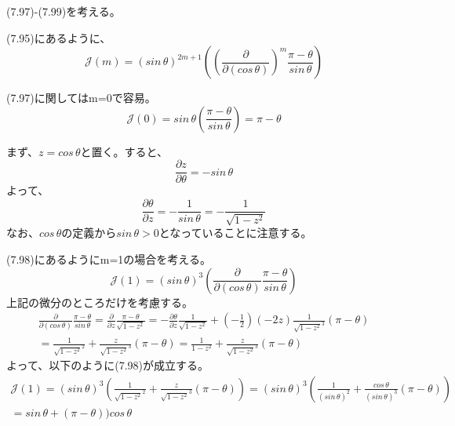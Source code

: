 \documentclass{jsarticle}
\begin{document}
(7.97)-(7.99)を考える。

(7.95)にあるように、
\begin{equation}
\mathcal{J}(m) = (sin\,\theta)^{2m+1} ((\frac{\partial}{\partial(cos\,\theta)})^{m}\frac{\pi - \theta}{sin\,\theta})
\end{equation}

(7.97)に関してはm=0で容易。
\begin{equation}
\mathcal{J}(0) = sin\,\theta (\frac{\pi - \theta}{sin\,\theta}) = \pi - \theta
\end{equation}

まず、$z = cos\,\theta$と置く。すると、
\begin{equation}
\frac{\partial z}{\partial \theta} = -sin\,\theta
\end{equation}
よって、
\begin{equation}
\frac{\partial \theta}{\partial z} = -\frac{1}{sin\,\theta} =  -\frac{1}{\sqrt{1-z^2}}
\end{equation}
なお、$cos\,\theta$の定義から$sin\,\theta > 0$となっていることに注意する。

(7.98)にあるようにm=1の場合を考える。
\begin{equation}
\mathcal{J}(1) = (sin\,\theta)^{3} (\frac{\partial}{\partial(cos\,\theta)}\frac{\pi - \theta}{sin\,\theta})
\end{equation}
上記の微分のところだけを考慮する。
\begin{equation}
\begin{split}
\frac{\partial}{\partial(cos\,\theta)}\frac{\pi - \theta}{sin\,\theta} = \frac{\partial}{\partial z}\frac{\pi - \theta}{\sqrt{1-z^2}}
= -\frac{\partial \theta}{\partial z}\frac{1}{\sqrt{1-z^2}} + (-\frac{1}{2})(-2z)\frac{1}{\sqrt{1-z^2}^3}(\pi - \theta)\\
= \frac{1}{\sqrt{1-z^2}^2} + \frac{z}{\sqrt{1-z^2}^3}(\pi - \theta)
= \frac{1}{1-z^2} + \frac{z}{\sqrt{1-z^2}^3}(\pi - \theta)
\end{split}
\end{equation}
よって、以下のように(7.98)が成立する。
\begin{equation}
\begin{split}
\mathcal{J}(1) = (sin\,\theta)^{3} (\frac{1}{\sqrt{1-z^2}^2} + \frac{z}{\sqrt{1-z^2}^3}(\pi - \theta))
=(sin\,\theta)^{3} (\frac{1}{(sin\,\theta)^2} + \frac{cos\,\theta}{(sin\,\theta)^3}(\pi - \theta))\\
=sin\,\theta + (\pi - \theta))cos\,\theta
\end{split}
\end{equation}
\end{document}
